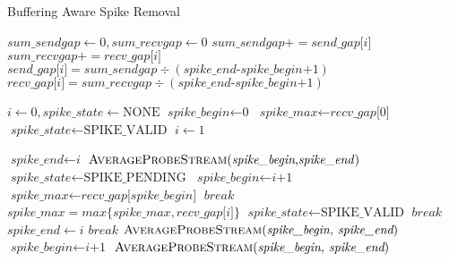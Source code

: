 \documentclass{article}
\begin{document}
\begin{algorithm}
\caption{Buffering Aware Spike Removal}\label{euclid}
\begin{algorithmic}[1]
\State $\textit{sum\_sendgap} \gets 0, \textit{sum\_recvgap} \gets 0$
\State $\textit{sum\_sendgap}+=\textit{send\_gap[i]}$
\State $\textit{sum\_recvgap}+=\textit{recv\_gap[i]}$
\EndFor
{}
\State $\textit{send\_gap[i]}=\textit{sum\_sendgap}\div(\textit{spike\_end-spike\_begin+1})$
\State $\textit{recv\_gap[i]}=\textit{sum\_recvgap}\div(\textit{spike\_end-spike\_begin+1})$
\EndFor
\EndIf
\EndFunction

\State $\textit{i} \gets 0,\textit{spike\_state} \gets \text{NONE}$
\State $\textit{spike\_begin} \gets \text{0} $
\State $\textit{spike\_max} \gets \textit{recv\_gap[0]}$
\State $\textit{spike\_state} \gets \text{SPIKE\_VALID}$
\State $\textit{i} \gets 1$
\EndIf

\State $\textit{spike\_end} \gets \textit{i}$
\State $\Call{AverageProbeStream}{$\textit{spike\_begin},\textit{spike\_end}$}$
\State $\textit{spike\_state} \gets \text{SPIKE\_PENDING}$
\State $\textit{spike\_begin} \gets \textit{i+1}$
\State $\textit{spike\_max} \gets \textit{recv\_gap[spike\_begin]}$
\EndIf
\State $break$
\EndCase
{}
\State $\textit{spike\_max} = max\{\textit{spike\_max},\textit{recv\_gap[i]}\}$
\State $\textit{spike\_state} \gets \text{SPIKE\_VALID}$
\Else
\State $break$
\EndIf
\EndCase
{}
\Else
{}
\State $\textit{spike\_end} \gets i$
\EndIf
\State $break$
\EndIf
\State $\Call{AverageProbeStream}{\textit{spike\_begin, spike\_end}}$
\State $\textit{spike\_begin} \gets \textit{i+1}$
\EndCase
\EndSwitch
\EndFor
\State $\Call{AverageProbeStream}{\textit{spike\_begin, spike\_end}}$
\EndFunction
\end{algorithmic}
\end{algorithm}
\end{document}
